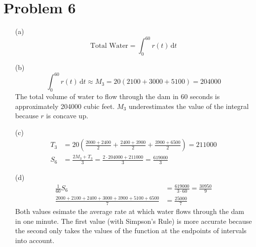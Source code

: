 \documentclass[preview, margin=0.6in]{standalone}
\newcommand*{\problem}[1]{\section*{Problem #1}}
\begin{document}
\problem{6}
\begin{itemize}
	\item[(a)]
		\begin{equation*}
		    \text{Total Water}=\int_{0}^{60}r(t)\,\mathrm{d}t
		\end{equation*}	
	\item[(b)]
		\begin{equation*}
		    \int_{0}^{60}r(t)\,\mathrm{d}t 
			\approx M_3
			=20\left(2100+3000+5100\right)
			=204000
		\end{equation*}
		The total volume of water to flow through the dam in 60 seconds is approximately 204000 cubic feet. $M_3$ underestimates the value of the integral because $r$ is concave up.
	\item[(c)]
		\begin{align*}
			T_3
			&=20\left(\frac{2000+2400}{2}+\frac{2400+3900}{2}+\frac{3900+6500}{2}\right)
			=211000 \\
			S_6&=\frac{2M_3+T_3}{3}=\frac{2\cdot204000+211000}{3}=\boxed{\frac{619000}{3}}
		\end{align*}
	\item[(d)]
		\begin{align*}
			\frac{1}{60}S_6&=\frac{619000}{3\cdot60}=\frac{30950}{9} \\
			\frac{2000+2100+2400+3000+3900+5100+6500}{7}&=\frac{25000}{7}
		\end{align*}
		Both values esimate the average rate at which water flows through the dam in one minute. The first value (with Simpson's Rule) is more accurate because the second only takes the values of the function at the endpoints of intervals into account.
\end{itemize}
\end{document}
